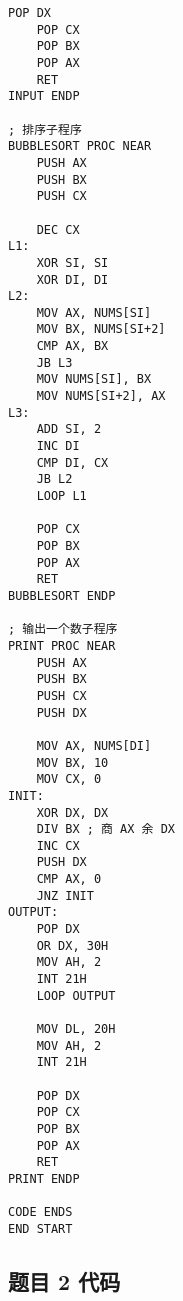 \documentclass[12pt,AutoFakeBold]{article}
\begin{document}
\begin{lstlisting}[language={[x86masm]Assembler}]
    POP DX
    POP CX
    POP BX
    POP AX
    RET
INPUT ENDP

; 排序子程序
BUBBLESORT PROC NEAR
    PUSH AX
    PUSH BX
    PUSH CX

    DEC CX
L1:
    XOR SI, SI
    XOR DI, DI
L2:
    MOV AX, NUMS[SI]
    MOV BX, NUMS[SI+2]
    CMP AX, BX
    JB L3
    MOV NUMS[SI], BX
    MOV NUMS[SI+2], AX
L3:
    ADD SI, 2
    INC DI
    CMP DI, CX
    JB L2
    LOOP L1
    
    POP CX
    POP BX
    POP AX
    RET       
BUBBLESORT ENDP

; 输出一个数子程序
PRINT PROC NEAR
    PUSH AX
    PUSH BX
    PUSH CX
    PUSH DX
    
    MOV AX, NUMS[DI]
    MOV BX, 10
    MOV CX, 0
INIT:
    XOR DX, DX
    DIV BX ; 商 AX 余 DX
    INC CX
    PUSH DX
    CMP AX, 0
    JNZ INIT
OUTPUT:
    POP DX
    OR DX, 30H
    MOV AH, 2
    INT 21H
    LOOP OUTPUT
    
    MOV DL, 20H
    MOV AH, 2
    INT 21H
    
    POP DX
    POP CX
    POP BX
    POP AX
    RET        
PRINT ENDP

CODE ENDS
END START
\end{lstlisting}

\subsection{题目 2 代码}
\end{document}

